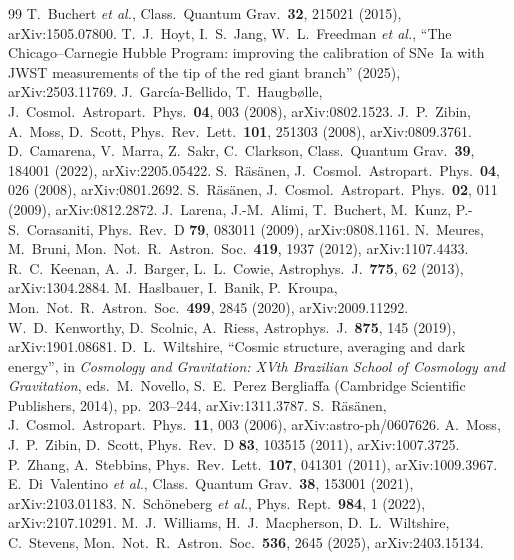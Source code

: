 \documentclass[aps,prd,twocolumn,nofootinbib,superscriptaddress,floatfix]{revtex4-2}
\begin{document}
\begin{thebibliography}{99}
 T.~Buchert \emph{et al.}, Class.\ Quantum Grav.\ \textbf{32}, 215021 (2015), arXiv:1505.07800.
 T.~J.~Hoyt, I.~S.~Jang, W.~L.~Freedman \emph{et al.}, ``The Chicago--Carnegie Hubble Program: improving the calibration of SNe~Ia with JWST measurements of the tip of the red giant branch'' (2025), arXiv:2503.11769.
 J.~Garc\'ia-Bellido, T.~Haugb\o lle, J.\ Cosmol.\ Astropart.\ Phys.\ \textbf{04}, 003 (2008), arXiv:0802.1523.
 J.~P.~Zibin, A.~Moss, D.~Scott, Phys.\ Rev.\ Lett.\ \textbf{101}, 251303 (2008), arXiv:0809.3761.
 D.~Camarena, V.~Marra, Z.~Sakr, C.~Clarkson, Class.\ Quantum Grav.\ \textbf{39}, 184001 (2022), arXiv:2205.05422.
 S.~R\"as\"anen, J.\ Cosmol.\ Astropart.\ Phys.\ \textbf{04}, 026 (2008), arXiv:0801.2692.
 S.~R\"as\"anen, J.\ Cosmol.\ Astropart.\ Phys.\ \textbf{02}, 011 (2009), arXiv:0812.2872.
 J.~Larena, J.-M.~Alimi, T.~Buchert, M.~Kunz, P.-S.~Corasaniti, Phys.\ Rev.\ D \textbf{79}, 083011 (2009), arXiv:0808.1161.
 N.~Meures, M.~Bruni, Mon.\ Not.\ R.\ Astron.\ Soc.\ \textbf{419}, 1937 (2012), arXiv:1107.4433.
 R.~C.~Keenan, A.~J.~Barger, L.~L.~Cowie, Astrophys.\ J.\ \textbf{775}, 62 (2013), arXiv:1304.2884.
 M.~Haslbauer, I.~Banik, P.~Kroupa, Mon.\ Not.\ R.\ Astron.\ Soc.\ \textbf{499}, 2845 (2020), arXiv:2009.11292.
 W.~D.~Kenworthy, D.~Scolnic, A.~Riess, Astrophys.\ J.\ \textbf{875}, 145 (2019), arXiv:1901.08681.
 D.~L.~Wiltshire, ``Cosmic structure, averaging and dark energy'', in \emph{Cosmology and Gravitation: XVth Brazilian School of Cosmology and Gravitation}, eds.\ M.~Novello, S.~E.~Perez Bergliaffa (Cambridge Scientific Publishers, 2014), pp.~203--244, arXiv:1311.3787.
 S.~R\"as\"anen, J.\ Cosmol.\ Astropart.\ Phys.\ \textbf{11}, 003 (2006), arXiv:astro-ph/0607626.
 A.~Moss, J.~P.~Zibin, D.~Scott, Phys.\ Rev.\ D \textbf{83}, 103515 (2011), arXiv:1007.3725.
 P.~Zhang, A.~Stebbins, Phys.\ Rev.\ Lett.\ \textbf{107}, 041301 (2011), arXiv:1009.3967.
 E.~Di~Valentino \emph{et al.}, Class.\ Quantum Grav.\ \textbf{38}, 153001 (2021), arXiv:2103.01183.
 N.~Sch\"oneberg \emph{et al.}, Phys.\ Rept.\ \textbf{984}, 1 (2022), arXiv:2107.10291.
 M.~J.~Williams, H.~J.~Macpherson, D.~L.~Wiltshire, C.~Stevens, Mon.\ Not.\ R.\ Astron.\ Soc.\ \textbf{536}, 2645 (2025), arXiv:2403.15134.

\end{thebibliography}
\end{document}
